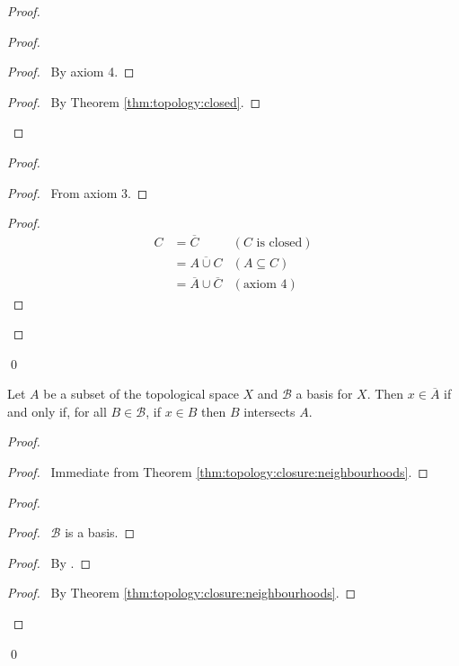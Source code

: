 \begin{proof}
\begin{proof}
\begin{proof}
      \pf\ By axiom 4.
    \end{proof}
    \qedstep
    \begin{proof}
      \pf\ By Theorem \ref{thm:topology:closed}.
    \end{proof}
  \end{proof}
  \begin{proof}
    \begin{proof}
      \pf\ From axiom 3.
    \end{proof}
    \begin{proof}
      \pf
      \begin{align*}
        C & = \overline{C} & (C \text{ is closed}) \\
        & = \overline{A \cup C} & (A \subseteq C) \\
        & = \overline{A} \cup \overline{C} & (\text{axiom 4})
      \end{align*}

    \end{proof}
  \end{proof}
  \qed
\end{proof}

\begin{thm}
  \label{thm:topology:closure:basis}
  Let $A$ be a subset of the topological space $X$ and $\mathcal{B}$ a basis
  for $X$. Then $x \in \overline{A}$ if and only if, for all $B \in
  \mathcal{B}$, if $x \in B$ then $B$ intersects $A$.
\end{thm}

\begin{proof}
  \pf
  \begin{proof}
    \pf\ Immediate from Theorem \ref{thm:topology:closure:neighbourhoods}.
  \end{proof}
  \begin{proof}
    \begin{proof}
      \pf\ $\mathcal{B}$ is a basis.
    \end{proof}
    \begin{proof}
      \pf\ By .
    \end{proof}
    \qedstep
    \begin{proof}
      \pf\ By Theorem \ref{thm:topology:closure:neighbourhoods}.
    \end{proof}
  \end{proof}
  \qed
\end{proof}

